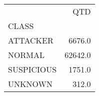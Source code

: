 \begin{tabular}{lr}
\toprule
{} &      QTD \\
CLASS      &          \\
\midrule
ATTACKER   &   6676.0 \\
NORMAL     &  62642.0 \\
SUSPICIOUS &   1751.0 \\
UNKNOWN    &    312.0 \\
\bottomrule
\end{tabular}

